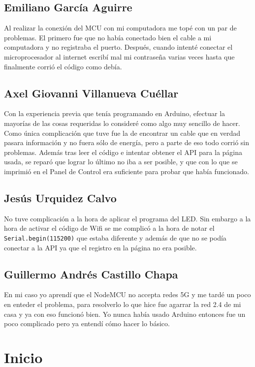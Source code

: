 \documentclass[12pt]{article}
\begin{document}
\subsection{Emiliano García Aguirre}
Al realizar la conexión del MCU con mi computadora me topé
con un par de problemas. El primero fue que no había
conectado bien el cable a mi computadora y no registraba el
puerto. Después, cuando intenté conectar el microprocesador
al internet escribí mal mi contraseña varias veces hasta que
finalmente corrió el código como debía. 

\subsection{Axel Giovanni Villanueva Cuéllar}
Con la experiencia previa que tenía programando en Arduino,
efectuar la mayorías de las cosas requeridas lo consideré
como algo muy sencillo de hacer. Como única complicación que
tuve fue la de encontrar un cable que en verdad pasara
información y no fuera sólo de energía, pero a parte de eso
todo corrió sin problemas. Además tras leer el código e
intentar obtener el API para la página usada, se reparó que
lograr lo último no iba a ser posible, y que con lo que se
imprimió en el Panel de Control era suficiente para probar
que había funcionado.

\subsection{Jesús Urquidez Calvo}
No tuve complicación a la hora de aplicar el programa del
LED. Sin embargo a la hora de activar el código de Wifi se
me complicó a la hora de notar el
\verb|Serial.begin(115200)| que estaba diferente y además de
que no se podía conectar a la API ya que el registro en la
página no era posible.

\subsection{Guillermo Andrés Castillo Chapa}
En mi caso yo aprendí que el NodeMCU no accepta redes 5G y
me tardé un poco en enteder el problema, para resolverlo lo
que hice fue agarrar la red 2.4 de mi casa y ya con eso
funcionó bien. Yo nunca había usado Arduino entonces fue un
poco complicado pero ya entendí cómo hacer lo básico.

\section{Inicio}
\end{document}
